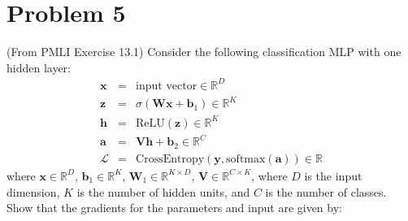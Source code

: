 \documentclass[11pt,twoside]{article}
\newcommand{\?}{\stackrel{?}{=}}
\newcommand{\mc}{\mathcal}
\begin{document}
\section*{Problem 5 }
(From PMLI Exercise 13.1) Consider the following classification MLP with one hidden layer:
\begin{eqnarray}
  \bm x &=& \text{input vector} \in \mathbb{R}^D \\
  \bm z &=& \sigma(\bm W\bm x + \bm b_{1}) \in \mathbb{R}^K \\
  \bm h &=& \text{ReLU}(\bm z)\in \mathbb{R}^K\\
  \bm a &=& \bm V\bm h + \bm b_2 \in \mathbb{R}^C\\
  \mc L &=& \text{CrossEntropy}(\bm y, \text{softmax}(\bm a)) \in \mathbb{R}
\end{eqnarray}
where $\bm x \in \mathbb{R}^D$, $\bm b_1 \in \mathbb{R}^K$, $\bm W_1 \in \mathbb{R}^{K\times D}$, $\bm V \in \mathbb{R}^{C\times K}$, where $D$ is the input dimension, $K$ is the number of hidden units, and $C$ is the number of classes. Show that the gradients for the parameters and input are given by:
\end{document}
